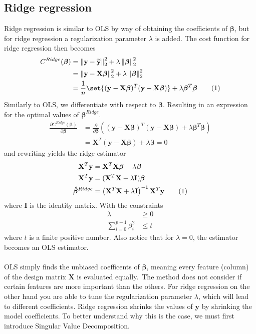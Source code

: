 \documentclass[a4paper,twocolumn]{article}
\DeclarePairedDelimiter\set\{\}
\newcommand\numberthis{\addtocounter{equation}{1}\tag{\theequation}}
\newcommand{\y}{\mathbf{y}}
\newcommand{\ytilde}{\mathbf{\widetilde{y}}}
\newcommand{\X}{\mathbf{X}}
\newcommand{\B}{\boldsymbol{\beta}}
\newcommand{\Bhat}{\boldsymbol{\hat{\beta}}}
\newcommand{\norm}[1]{\left\lVert#1\right\rVert}
\begin{document}
\subsection{Ridge regression}
Ridge regression is similar to OLS by way of obtaining the coefficients of $\B$, but for ridge regression a regularization parameter $\lambda$ is added. The cost function for ridge regression then becomes
\begin{align*}
    C^{Ridge}(\B) &= \norm{\y - \ytilde}_{2}^{2} + \lambda\norm{\B}_{2}^{2}\\
    &= \norm{\y - \X\B}_{2}^{2} + \lambda\norm{\B}_{2}^{2}\\
    &= \frac{1}{n}\set{(\y - \X\B)^{T}(\y - \X\B)} + \lambda\B^{T}\B \numberthis\label{eqn}
\end{align*}
Similarly to OLS, we differentiate with respect to $\B$. Resulting in an expression for the optimal values of $\B^{Ridge}$.
\begin{align*}
    \frac{\partial C^{Ridge}(\B)}{\partial \B} &= \frac{\partial}{\partial \B}\left((\y - \X\B)^{T}(\y - \X\B) + \lambda\B^{T}\B\right)\\
    &= \X^{T}(\y - \X\B) + \lambda\B = 0
\end{align*}
and rewriting yields the ridge estimator
\begin{align*}
    \X^{T}\y &= \X^{T}\X\B + \lambda\B\\
    \X^{T}\y &= (\X^{T}\X + \lambda \mathbf{I})\B\\
    \Bhat^{Ridge} &= \left(\X^{T}\X + \lambda \mathbf{I}\right)^{-1}\X^{T}\y \numberthis\label{eqn}
\end{align*}
where $\mathbf{I}$ is the identity matrix. With the constraints
\begin{align*}
    \lambda &\geq 0\\
    \sum_{i=0}^{p-1}\beta_{i}^{2} &\leq t
\end{align*}
where $t$ is a finite positive number. Also notice that for $\lambda = 0$, the estimator becomes an OLS estimator. \\
\\
OLS simply finds the unbiased coefficents of $\B$, meaning every feature (column) of the design matrix $\X$ is evaluated equally.\ The method does not consider if certain features are more important than the others. For ridge regression on the other hand you are able to tune the regularization parameter $\lambda$, which will lead to different coefficients. Ridge regression shrinks the values of $\y$ by shrinking the model coefficients. To better understand why this is the case, we must first introduce Singular Value Decomposition\cite{ridge1, ridge2}.
\end{document}
